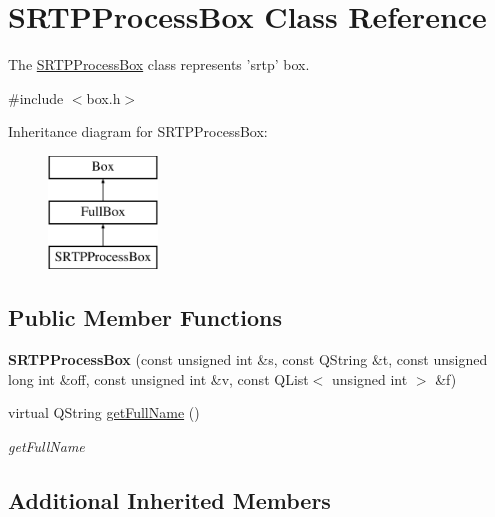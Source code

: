 \hypertarget{class_s_r_t_p_process_box}{\section{S\-R\-T\-P\-Process\-Box Class Reference}
\label{class_s_r_t_p_process_box}
}


The \hyperlink{class_s_r_t_p_process_box}{S\-R\-T\-P\-Process\-Box} class represents 'srtp' box.  




{\ttfamily \#include $<$box.\-h$>$}

Inheritance diagram for S\-R\-T\-P\-Process\-Box\-:\begin{figure}[H]
\begin{center}
\leavevmode
\includegraphics[height=3.000000cm]{class_s_r_t_p_process_box}
\end{center}
\end{figure}
\subsection*{Public Member Functions}
\begin{DoxyCompactItemize}
\item 
\hypertarget{class_s_r_t_p_process_box_aaa40aef322e1a3e139bd8eff4cdf2166}{{\bfseries S\-R\-T\-P\-Process\-Box} (const unsigned int \&s, const Q\-String \&t, const unsigned long int \&off, const unsigned int \&v, const Q\-List$<$ unsigned int $>$ \&f)}\label{class_s_r_t_p_process_box_aaa40aef322e1a3e139bd8eff4cdf2166}

\item 
virtual Q\-String \hyperlink{class_s_r_t_p_process_box_ae1f412cb4d3fe567a42226acd6b13542}{get\-Full\-Name} ()
\begin{DoxyCompactList}\small\item\em get\-Full\-Name \end{DoxyCompactList}\end{DoxyCompactItemize}
\subsection*{Additional Inherited Members}


